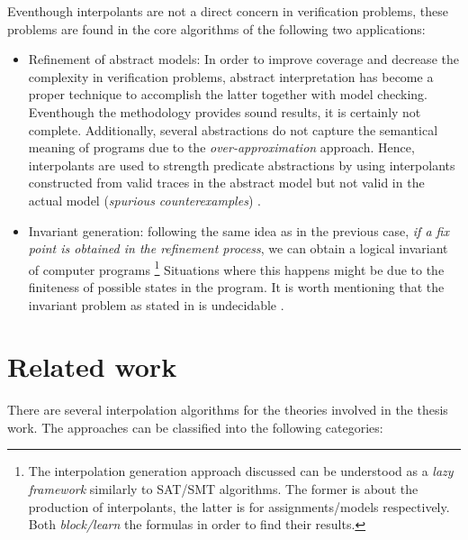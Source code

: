 Eventhough interpolants are not a direct concern in verification
problems, these problems are found in the core algorithms of the 
following two applications:

\begin{itemize}
  \item Refinement of abstract models: In order to improve 
    coverage and decrease the complexity in verification problems,
    abstract interpretation has become a proper technique to 
    accomplish the latter together with model checking. Eventhough the
    methodology provides sound results, it is certainly not complete.
    Additionally, several abstractions do not capture the semantical
    meaning of programs due to the \emph{over-approximation} approach.
    Hence, interpolants are used to strength predicate
    abstractions by using interpolants constructed from valid 
    traces in the abstract model but not valid in the actual model
    (\emph{spurious counterexamples}) \cite{10.1145/876638.876643,
    10.1007/978-3-540-45069-6_1, 10.1145/982962.964021}.
  \item Invariant generation: following the same idea as in the previous
    case, \emph{if a fix point is obtained in the refinement process},
    we can obtain a logical invariant of computer programs 
    \footnote{The interpolation
      generation approach discussed can be understood as a \emph{lazy framework}
      similarly to SAT/SMT algorithms. The former is
      about the production of interpolants, the latter is for 
      assignments/models respectively. Both \emph{block/learn} the formulas
    in order to find their results.}
    Situations where this happens might be due to the finiteness of possible 
    states in the program. It is worth mentioning that the 
    invariant problem as stated in \cite{10.1145/363235.363259} 
    is undecidable \cite{10.2307/1990888, 10.1145/371282.371285}.
\end{itemize}

\section{Related work}

There are several interpolation algorithms for the theories
involved in the thesis work. The approaches can be classified
into the following categories:

